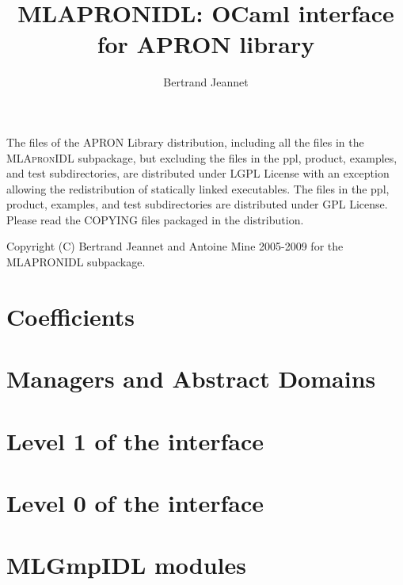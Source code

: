 \documentclass[twoside,10pt,a4paper]{report}
\title{MLAPRONIDL: OCaml interface for APRON library}
\author{Bertrand Jeannet}
\begin{document}
\maketitle

\vspace*{0.9\textheight}

The files of the APRON Library distribution, including all the files in the \textsc{MLApronIDL} subpackage, but excluding the files in the ppl, product, examples, and test subdirectories, are distributed under LGPL License with an exception allowing the redistribution of statically linked executables.
The files in the ppl, product, examples, and test subdirectories are distributed under GPL License.
Please read the COPYING files packaged in the distribution.

Copyright (C) Bertrand Jeannet and Antoine Mine 2005-2009 for the
\textsc{MLAPRONIDL} subpackage.

\newpage

\tableofcontents



\part{Coefficients}




\part{Managers and Abstract Domains}








\part{Level 1 of the interface}










\part{Level 0 of the interface}








\part{MLGmpIDL modules}









\appendix
\printindex
\end{document}

